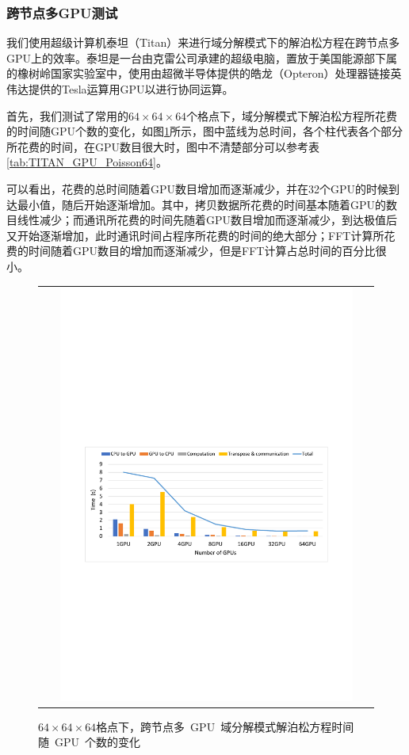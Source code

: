 \subsubsection{跨节点多GPU测试}
我们使用超级计算机泰坦（Titan）来进行域分解模式下的解泊松方程在跨节点多GPU上的效率。泰坦是一台由克雷公司承建的超级电脑，置放于美国能源部下属的橡树岭国家实验室中，使用由超微半导体提供的皓龙（Opteron）处理器链接英伟达提供的Tesla运算用GPU以进行协同运算。

首先，我们测试了常用的$64 \times 64 \times 64$个格点下，域分解模式下解泊松方程所花费的时间随GPU个数的变化，如图\ref{fig:TITAN_GPU_Poisson64}所示，图中蓝线为总时间，各个柱代表各个部分所花费的时间，在GPU数目很大时，图中不清楚部分可以参考表\ref{tab:TITAN_GPU_Poisson64}。

可以看出，花费的总时间随着GPU数目增加而逐渐减少，并在32个GPU的时候到达最小值，随后开始逐渐增加。其中，拷贝数据所花费的时间基本随着GPU的数目线性减少；而通讯所花费的时间先随着GPU数目增加而逐渐减少，到达极值后又开始逐渐增加，此时通讯时间占程序所花费的时间的绝大部分；FFT计算所花费的时间随着GPU数目的增加而逐渐减少，但是FFT计算占总时间的百分比很小。

\begin{figure}[!htb]
  \centering
  \begin{tabular}{|l|l|}
    \multicolumn{2}{c}{
    \includegraphics[width=0.9\textwidth]{Img/domain_decomposition_Titan64.pdf}} \\
  \end{tabular}
  \caption{$64 \times 64 \times 64$格点下，跨节点多~GPU~域分解模式解泊松方程时间随~GPU~个数的变化}
  \label{fig:TITAN_GPU_Poisson64}
\end{figure}

